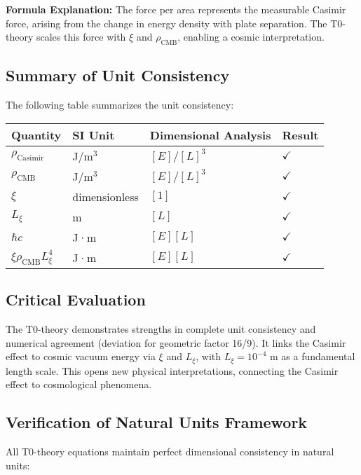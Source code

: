 \documentclass[12pt,a4paper]{article}
\theoremstyle{definition}
\theoremstyle{remark}
\begin{document}
	\textbf{Formula Explanation:} The force per area represents the measurable Casimir force, arising from the change in energy density with plate separation. The T0-theory scales this force with $\xi$ and $\rho_{\text{CMB}}$, enabling a cosmic interpretation.
	
	\subsection{Summary of Unit Consistency}
	The following table summarizes the unit consistency:
	\begin{table}[h]
		\centering
		\begin{tabular}{l l l l}
			\toprule
			Quantity & SI Unit & Dimensional Analysis & Result \\
			\midrule
			$\rho_{\text{Casimir}}$ & J/m$^3$ & $[E]/[L]^3$ & $\checkmark$ \\
			$\rho_{\text{CMB}}$ & J/m$^3$ & $[E]/[L]^3$ & $\checkmark$ \\
			$\xi$ & dimensionless & $[1]$ & $\checkmark$ \\
			$L_\xi$ & m & $[L]$ & $\checkmark$ \\
			$\hbar c$ & J·m & $[E][L]$ & $\checkmark$ \\
			$\xi \rho_{\text{CMB}} L_\xi^4$ & J·m & $[E][L]$ & $\checkmark$ \\
			\bottomrule
		\end{tabular}
	\end{table}
	
	\subsection{Critical Evaluation}
	The T0-theory demonstrates strengths in complete unit consistency and numerical agreement (deviation for geometric factor 16/9). It links the Casimir effect to cosmic vacuum energy via $\xi$ and $L_\xi$, with $L_\xi = 10^{-4}$ m as a fundamental length scale. This opens new physical interpretations, connecting the Casimir effect to cosmological phenomena.
	
	\subsection{Verification of Natural Units Framework}
	
	All T0-theory equations maintain perfect dimensional consistency in natural units:
	
\end{document}
